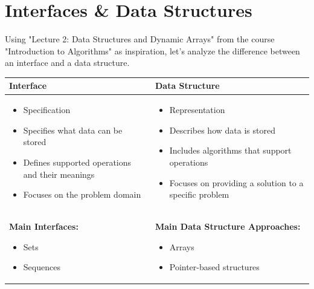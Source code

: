 \documentclass[a4paper,10pt]{article}
\newcommand{\hlt}[1]{\colorbox{color3}{#1}}
\begin{document}
\section{Interfaces \& Data Structures}

Using "Lecture 2: Data Structures and Dynamic Arrays" from the course "Introduction to Algorithms" \cite{mit6006} as inspiration, let's analyze the difference between an interface and a data structure.
\\

\begin{center}
\renewcommand{\arraystretch}{1}
\small
\begin{tabular}{@{}p{}|p{}@{}}
\toprule
\textbf{Interface} & \textbf{Data Structure} 
\\
\midrule
\begin{itemize}[leftmargin=*, itemsep=0pt]
    \item Specification
    \item Specifies \hlt{what} data can be stored
    \item Defines supported operations and their meanings
    \item Focuses on the problem domain
\end{itemize}
&
\begin{itemize}[leftmargin=*, itemsep=0pt]
    \item Representation
    \item Describes \hlt{how} data is stored
    \item Includes algorithms that support operations
    \item Focuses on providing a solution to a specific problem
\end{itemize}
\\
\midrule
\textbf{Main Interfaces:}
\begin{itemize}[leftmargin=*, itemsep=0pt]
    \item Sets
    \item Sequences
\end{itemize}
&
\textbf{Main Data Structure Approaches:}
\begin{itemize}[leftmargin=*, itemsep=0pt]
    \item Arrays
    \item Pointer-based structures
\end{itemize}
\\
\bottomrule
\end{tabular}
\end{center}
\end{document}
